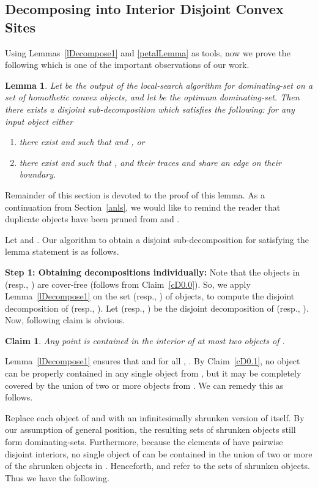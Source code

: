 \documentclass[a4paper,11pt]{article}
\newtheorem{lemma}{Lemma}
\newtheorem{claim}{Claim}
\begin{document}
\subsection{Decomposing into Interior Disjoint  Convex Sites}\label{SDecompose2}
Using  Lemmas~\ref{lDecompose1} and \ref{petalLemma} as tools, now we prove the following which is one of  the 
important observations of our work.

\begin{lemma}\label{lDecompose2}
Let   be the output of the local-search algorithm for dominating-set on a set  of homothetic convex objects, and let    be the optimum dominating-set. 
Then there exists
a disjoint sub-decomposition   which 
satisfies the following:
for any input  object   
either
\begin{enumerate}[label=(\roman*)]
 \item  there exist   and 
 such that   and  , or
\item there exist 
  and 
 such that  , and their traces
 and   share an edge  on their boundary.
\end{enumerate}
\end{lemma}
Remainder of this section is devoted to the proof of this lemma. As a continuation  from Section~\ref{anls}, we would like to remind the reader that  duplicate objects have been pruned from  and .
   
Let   and .
Our algorithm to obtain a disjoint
sub-decomposition   for 
 satisfying the lemma statement is  as follows. 


{\bf Step 1: Obtaining  decompositions individually:} 
Note that the objects in  (resp., ) are cover-free (follows from Claim~\ref{cD0.0}). So, we  apply  Lemma~\ref{lDecompose1} on the set  (resp., ) of
objects, to compute 
the disjoint decomposition of  (resp., ).
Let  (resp.,  ) be the  disjoint decomposition of 
 (resp., ). Now, following claim is obvious.

\begin{claim}\label{cD0}
Any point  is contained in the interior of  at most two objects 
of  .
\end{claim}

Lemma~\ref{lDecompose1} ensures that    and
  for all , .  
By Claim~\ref{cD0.1}, no object  can be properly contained in any single object from , but it may be completely covered by the union of  two or more objects from . We can remedy this as follows.

Replace each object of  and  with an infinitesimally shrunken version of itself. By our assumption of general position, the resulting sets of shrunken objects still form dominating-sets. Furthermore, because the elements of  have pairwise disjoint interiors, no single object of  can be contained in the union of two or more of the shrunken objects in . Henceforth,  and  refer to the sets of shrunken objects. Thus we have the following.
\end{document}
